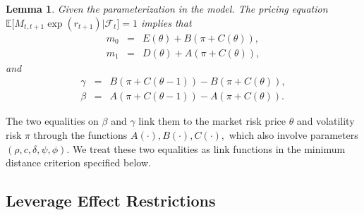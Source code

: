 \documentclass[11pt]{article}
\newtheorem{lemma}{Lemma}[section]
\begin{document}
\begin{lemma}
\label{Lemma m0 and m1}Given the parameterization in the model. The pricing
equation $\mathbb{E[}M_{t,t+1}\exp (r_{t+1})|\mathcal{F}_{t}]=1$ implies that%
\begin{eqnarray*}
m_{0} &=&E(\theta )+B\left( \pi +C\left( \theta \right) \right) , \\
m_{1} &=&D\left( \theta \right) +A\left( \pi +C\left( \theta \right) \right)
,
\end{eqnarray*}%
and%
\begin{eqnarray*}
\gamma  &=&B\left( \pi +C\left( \theta -1\right) \right) -B\left( \pi
+C\left( \theta \right) \right) , \\
\beta  &=&A\left( \pi +C\left( \theta -1\right) \right) -A\left( \pi
+C\left( \theta \right) \right) .
\end{eqnarray*}
\end{lemma}

The two equalities on $\beta $ and $\gamma $ link them to the market risk
price $\theta $ and volatility risk $\pi $ through the functions $A(\cdot
),B(\cdot ),C(\cdot ),$ which also involve parameters $(\rho ,c,\delta ,\psi
,\phi ).$ We treat these two equalities as link functions in the minimum
distance criterion specified below.

\subsection{Leverage Effect Restrictions}
\end{document}
